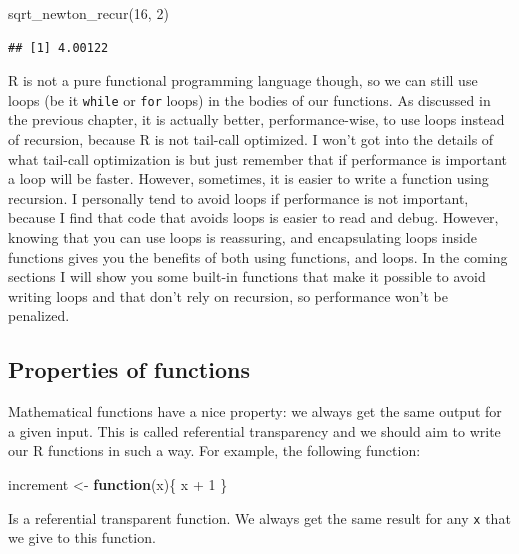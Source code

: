 \documentclass[
]{article}
\newenvironment{Shaded}{\begin{snugshade}}{\end{snugshade}}
\newcommand{\ControlFlowTok}[1]{\textcolor[rgb]{0.13,0.29,0.53}{\textbf{#1}}}
\newcommand{\DecValTok}[1]{\textcolor[rgb]{0.00,0.00,0.81}{#1}}
\newcommand{\FunctionTok}[1]{\textcolor[rgb]{0.00,0.00,0.00}{#1}}
\newcommand{\NormalTok}[1]{#1}
\newcommand{\OtherTok}[1]{\textcolor[rgb]{0.56,0.35,0.01}{#1}}
\newcommand{\SpecialCharTok}[1]{\textcolor[rgb]{0.00,0.00,0.00}{#1}}
\begin{document}
\begin{Shaded}
\begin{Highlighting}[]
\FunctionTok{sqrt\_newton\_recur}\NormalTok{(}\DecValTok{16}\NormalTok{, }\DecValTok{2}\NormalTok{)}
\end{Highlighting}
\end{Shaded}

\begin{verbatim}
## [1] 4.00122
\end{verbatim}

R is not a pure functional programming language though, so we can still use loops (be it \texttt{while} or
\texttt{for} loops) in the bodies of our functions. As discussed in the previous chapter, it is actually
better, performance-wise, to use loops instead of recursion, because R is not tail-call optimized.
I won't got into the details of what tail-call optimization is but just remember that if
performance is important a loop will be faster. However, sometimes, it is easier to write a
function using recursion. I personally tend to avoid loops if performance is not important,
because I find that code that avoids loops is easier to read and debug. However, knowing that
you can use loops is reassuring, and encapsulating loops inside functions gives you the benefits of
both using functions, and loops. In the coming sections I will show you some built-in functions
that make it possible to avoid writing loops and that don't rely on recursion, so performance
won't be penalized.

\hypertarget{properties-of-functions}{%
\subsection{Properties of functions}\label{properties-of-functions}}

Mathematical functions have a nice property: we always get the same output for a given input. This
is called referential transparency and we should aim to write our R functions in such a way.
For example, the following function:

\begin{Shaded}
\begin{Highlighting}[]
\NormalTok{increment }\OtherTok{\textless{}{-}} \ControlFlowTok{function}\NormalTok{(x)\{}
\NormalTok{    x }\SpecialCharTok{+} \DecValTok{1}
\NormalTok{\}}
\end{Highlighting}
\end{Shaded}

Is a referential transparent function. We always get the same result for any \texttt{x} that we give to
this function.
\end{document}
